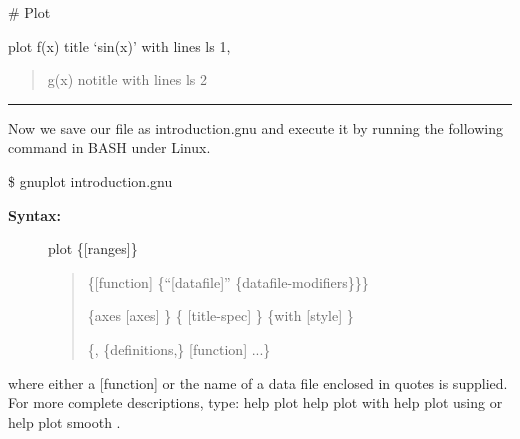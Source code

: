 \documentclass[letterpaper,10pt,english]{sphinxmanual}
\begin{document}
\# Plot

plot f(x) title `sin(x)' with lines ls 1, 
\begin{quote}

g(x) notitle with lines ls 2
\end{quote}


\bigskip\hrule{}\bigskip


Now we save our file as introduction.gnu and execute it by running the following command in BASH under Linux.

\$ gnuplot introduction.gnu
\begin{description}
\item[{\textbf{Syntax:}}] \leavevmode
plot \{{[}ranges{]}\}
\begin{quote}

\{{[}function{]} \textbar{} \{``{[}datafile{]}'' \{datafile-modifiers\}\}\}

\{axes {[}axes{]} \} \{ {[}title-spec{]} \} \{with {[}style{]} \}

\{, \{definitions,\} {[}function{]} ...\}
\end{quote}

\end{description}

where either a {[}function{]} or the name of a data file enclosed in quotes is supplied. For more complete descriptions, type: help plot help plot with help plot using or help plot smooth .
\end{document}
